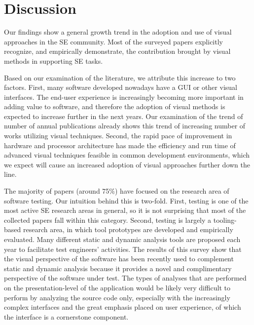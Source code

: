 \section{Discussion}\label{sec:discussion}

Our findings show a general growth trend in the adoption and use of visual approaches
in the SE community.
Most of the surveyed papers explicitly recognize, and empirically
demonstrate, the contribution brought by visual methods in supporting SE tasks.

Based on our examination of the literature,
we attribute this increase to two factors.
First, many software developed nowadays have a GUI or other visual interfaces.
The end-user experience is increasingly becoming more important in adding value
to software, and therefore the adoption of visual methods is expected to
increase further in the next years.
Our examination of the trend of number of annual publications 
already shows this trend of increasing number of works utilizing 
visual techniques.
Second, the rapid pace of improvement in hardware and processor architecture has made
the efficiency and run time of advanced visual techniques feasible in common
development environments, which we expect will cause an increased adoption of
visual approaches further down the line.

The majority of papers (around 75\%) have focused on the research area of
software testing.
Our intuition behind this is two-fold.
First, testing is one of the most active SE research areas in general,
so it is not surprising that most of the collected papers fall
within this category.
Second, testing is largely a tooling-based research area, in which
tool prototypes are developed and empirically evaluated.
Many different static and dynamic analysis tools are proposed each year
to facilitate test engineers' activities. 
The results of this survey show that the visual perspective of the software
has been recently used to complement static and dynamic analysis because
it provides a novel and complimentary perspective of the software under test.
The types of analyses that are performed on the presentation-level of the
application would be likely very difficult to perform by analyzing the source code only,
especially with the increasingly complex interfaces and the great emphasis
placed on user experience, of which the interface is a cornerstone component.


